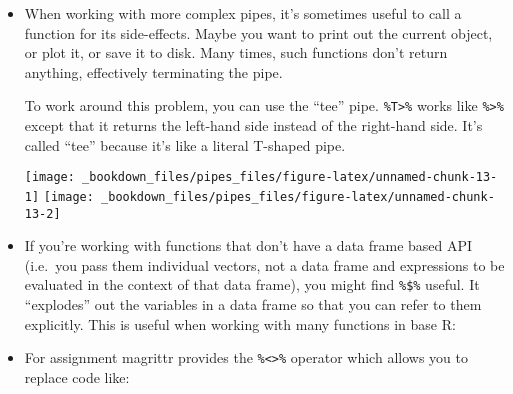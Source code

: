 \documentclass[]{book}
\newenvironment{Shaded}{\begin{snugshade}}{\end{snugshade}}
\newcommand{\KeywordTok}[1]{\textcolor[rgb]{0.13,0.29,0.53}{\textbf{{#1}}}}
\newcommand{\DataTypeTok}[1]{\textcolor[rgb]{0.13,0.29,0.53}{{#1}}}
\newcommand{\DecValTok}[1]{\textcolor[rgb]{0.00,0.00,0.81}{{#1}}}
\newcommand{\StringTok}[1]{\textcolor[rgb]{0.31,0.60,0.02}{{#1}}}
\newcommand{\CommentTok}[1]{\textcolor[rgb]{0.56,0.35,0.01}{\textit{{#1}}}}
\newcommand{\NormalTok}[1]{{#1}}
\begin{document}
\begin{itemize}
\item
  When working with more complex pipes, it's sometimes useful to call a
  function for its side-effects. Maybe you want to print out the current
  object, or plot it, or save it to disk. Many times, such functions
  don't return anything, effectively terminating the pipe.

  To work around this problem, you can use the ``tee'' pipe.
  \texttt{\%T\textgreater{}\%} works like \texttt{\%\textgreater{}\%}
  except that it returns the left-hand side instead of the right-hand
  side. It's called ``tee'' because it's like a literal T-shaped pipe.

\begin{Shaded}
\end{Shaded}

  \begin{center}\texttt{[image: \_bookdown\_files/pipes\_files/figure-latex/unnamed-chunk-13-1]} \texttt{[image: \_bookdown\_files/pipes\_files/figure-latex/unnamed-chunk-13-2]} \end{center}
\item
  If you're working with functions that don't have a data frame based
  API\\
  (i.e.~you pass them individual vectors, not a data frame and
  expressions to be evaluated in the context of that data frame), you
  might find \texttt{\%\$\%} useful. It ``explodes'' out the variables
  in a data frame so that you can refer to them explicitly. This is
  useful when working with many functions in base R:

\begin{Shaded}
\end{Shaded}
\item
  For assignment magrittr provides the
  \texttt{\%\textless{}\textgreater{}\%} operator which allows you to
  replace code like:


\end{itemize}
\end{document}
